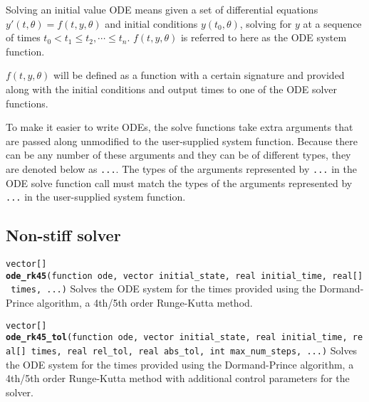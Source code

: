 \documentclass[
  10pt,
]{book}
\begin{document}
Solving an initial value ODE means given a set of differential equations
\(y'(t, \theta) = f(t, y, \theta)\) and initial conditions \(y(t_0, \theta)\),
solving for \(y\) at a sequence of times \(t_0 < t_1 \leq t_2, \cdots \leq t_n\).
\(f(t, y, \theta)\) is referred to here as the ODE system function.

\(f(t, y, \theta)\) will be defined as a function with a certain signature
and provided along with the initial conditions and output times to one of the
ODE solver functions.

To make it easier to write ODEs, the solve functions take extra arguments
that are passed along unmodified to the user-supplied system function.
Because there can be any number of these arguments and they can be of different types,
they are denoted below as \texttt{...}. The types of the arguments represented by \texttt{...}
in the ODE solve function call must match the types of the arguments represented by
\texttt{...} in the user-supplied system function.

\hypertarget{non-stiff-solver}{%
\subsection{Non-stiff solver}\label{non-stiff-solver}}


\texttt{vector{[}{]}} \textbf{\texttt{ode\_rk45}}\texttt{(function\ ode,\ vector\ initial\_state,\ real\ initial\_time,\ real{[}{]}\ times,\ ...)}\newline
Solves the ODE system for the times provided using the Dormand-Prince
algorithm, a 4th/5th order Runge-Kutta method.


\texttt{vector{[}{]}} \textbf{\texttt{ode\_rk45\_tol}}\texttt{(function\ ode,\ vector\ initial\_state,\ real\ initial\_time,\ real{[}{]}\ times,\ real\ rel\_tol,\ real\ abs\_tol,\ int\ max\_num\_steps,\ ...)}\newline
Solves the ODE system for the times provided using the Dormand-Prince
algorithm, a 4th/5th order Runge-Kutta method with additional control
parameters for the solver.

\end{document}
